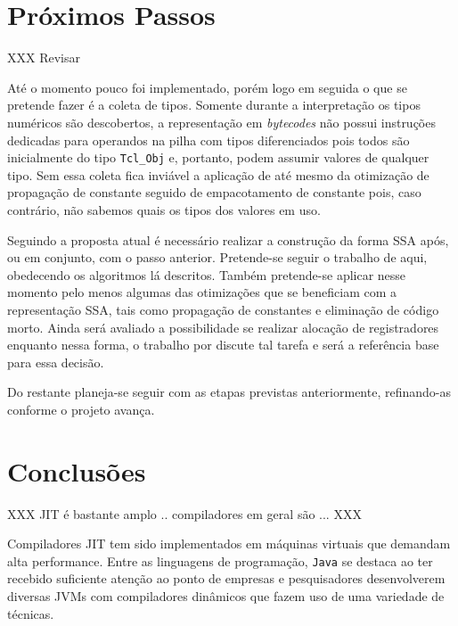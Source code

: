 

\section{Próximos Passos}

XXX Revisar

Até o momento pouco foi implementado, porém logo em seguida o que se pretende
fazer é a coleta de tipos. Somente durante a interpretação os
tipos numéricos são descobertos, a representação em \textit{bytecodes}
não possui instruções dedicadas para operandos na pilha com tipos
diferenciados pois todos são inicialmente do tipo \verb!Tcl_Obj! e,
portanto, podem assumir valores de qualquer tipo. Sem essa
coleta fica inviável a
aplicação de até mesmo da otimização de propagação de constante
seguido de empacotamento de constante pois, caso contrário, não
sabemos quais os tipos dos valores em uso.

Seguindo a proposta atual é necessário realizar a construção da forma
SSA após, ou em conjunto, com o passo anterior. Pretende-se seguir o
trabalho de  aqui, obedecendo os algoritmos lá
descritos. Também pretende-se aplicar nesse momento pelo menos algumas
das otimizações que se beneficiam com a representação SSA, tais como
propagação de constantes e eliminação de código morto. Ainda será
avaliado a possibilidade se realizar alocação de registradores
enquanto nessa forma, o trabalho por  discute
tal tarefa e será a referência base para essa decisão.

Do restante planeja-se seguir com as etapas previstas anteriormente,
refinando-as conforme o projeto avança.


\section{Conclusões}

XXX JIT é bastante amplo .. compiladores em geral são ... XXX

Compiladores JIT tem sido implementados em máquinas virtuais que demandam
alta performance. Entre as linguagens de programação, \texttt{Java} se
destaca ao ter recebido suficiente atenção ao ponto de empresas e
pesquisadores desenvolverem diversas JVMs com compiladores
dinâmicos que fazem uso de uma variedade de técnicas.

